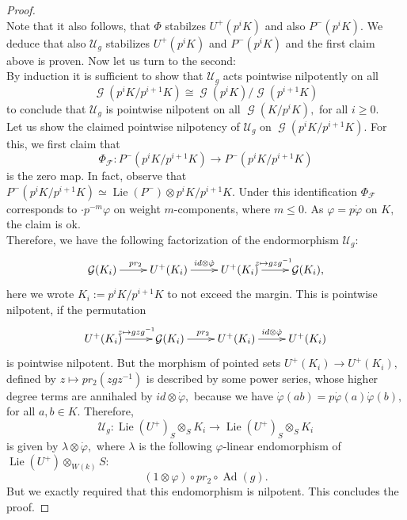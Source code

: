 \documentclass[a4paper,10,5 pt]{amsart}
\theoremstyle{definition}
\DeclareMathOperator{\Lie}{Lie}
\DeclareMathOperator{\Ad}{Ad}
\DeclareMathOperator{\G}{\mathcal{G}}
\begin{document}
\begin{proof}
$$$$
Note that it also follows, that $\Phi$ stabilzes $U^{+}(p^{i}K)$ and also $P^{-}(p^{i}K)$. We deduce that also $\mathcal{U}_{g}$ stabilizes $U^{+}(p^{i}K)$ and $P^{-}(p^{i}K)$ and the first claim above is proven. Now let us turn to the second:
\\
By induction it is sufficient to show that $\mathcal{U}_{g}$ acts pointwise nilpotently on all $$\G(p^{i}K/p^{i+1}K)\cong \G(p^{i}K)/\G(p^{i+1}K)$$ to conclude that $\mathcal{U}_{g}$ is pointwise nilpotent on all $\G(K/p^{i}K),$ for all $i\geq 0.$
\\
Let us show the claimed pointwise nilpotency of $\mathcal{U}_{g}$ on $\G(p^{i}K/p^{i+1}K).$
For this, we first claim that
$$\Phi_{\mathcal{F}}\colon P^{-}(p^{i}K/p^{i+1}K)\rightarrow P^{-}(p^{i}K/p^{i+1}K)$$ is the zero map. In fact, observe that $P^{-}(p^{i}K/p^{i+1}K)\simeq \Lie(P^{-})\otimes p^{i}K/p^{i+1}K.$ Under this identification $\Phi_{\mathcal{F}}$ corresponds to $\cdot p^{-m}\varphi$ on weight $m$-components, where $m\leq 0.$ As $\varphi=p\dot{\varphi}$ on $K,$ the claim is ok.
\\
Therefore, we have the following factorization of the endormorphism $\mathcal{U}_{g}:$
$$\xymatrix{
\G(K_{i}) \ar[r]^{pr_{2}} & U^{+}(K_{i}) \ar[r]^{id\otimes \dot{\varphi}} & U^{+}(K_{i}) \ar[r]^{z\mapsto gzg^{-1}} & \G(K_{i}),
}$$
here we wrote $K_{i}:=p^{i}K/p^{i+1}K$ to not exceed the margin. This is pointwise nilpotent, if the permutation
$$
\xymatrix{
U^{+}(K_{i}) \ar[r]^{z\mapsto gzg^{-1}} & \G(K_{i}) \ar[r]^{pr_{2}} & U^{+}(K_{i}) \ar[r]^{id\otimes \dot{\varphi}} & U^{+}(K_{i})
}
$$
is pointwise nilpotent.
But the morphism of pointed sets $U^{+}(K_{i}) \rightarrow U^{+}(K_{i}),$ defined by $z\mapsto pr_{2}(zgz^{-1})$ is described by some power series, whose higher degree terms are annihaled by $id\otimes \dot{\varphi},$ because we have $\dot{\varphi}(ab)=p\dot{\varphi}(a)\dot{\varphi}(b),$ for all $a,b\in K.$ Therefore,
$$\mathcal{U}_{g}\colon \Lie(U^{+})_{S}\otimes_{S} K_{i} \rightarrow \Lie(U^{+})_{S}\otimes_{S} K_{i}$$
is given by $\lambda \otimes \dot{\varphi},$ where $\lambda$ is the following $\varphi$-linear endomorphism of $\Lie(U^{+})\otimes_{W(k)} S$:
$$(1\otimes \varphi)\circ pr_{2} \circ \Ad(g).$$
But we exactly required that this endomorphism is nilpotent. This concludes the proof.
\end{proof}
\end{document}
